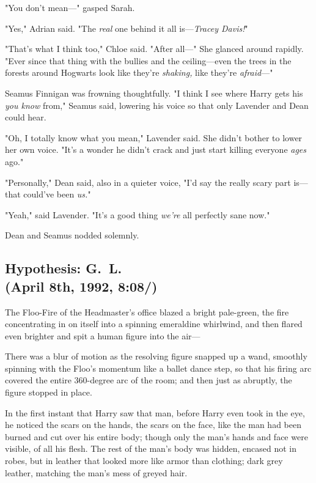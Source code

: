 "You don't mean---" gasped Sarah.

"Yes," Adrian said. "The \emph{real} one behind it all is---\emph{Tracey
Davis!}"

"That's what I think too," Chloe said. "After all---" She glanced around
rapidly. "Ever since that thing with the bullies and the ceiling---even the
trees in the forests around Hogwarts look like they're \emph{shaking,} like
they're \emph{afraid}---"

Seamus Finnigan was frowning thoughtfully. "I think I see where Harry gets
his{\el} \emph{you know{\el}} from," Seamus said, lowering his voice so
that only Lavender and Dean could hear.

"Oh, I totally know what you mean," Lavender said. She didn't bother to lower
her own voice. "It's a wonder he didn't crack and just start killing everyone
\emph{ages} ago."

"Personally," Dean said, also in a quieter voice, "I'd say the really scary
part is---that could've been \emph{us.}"

"Yeah," said Lavender. "It's a good thing \emph{we're} all perfectly sane now."

Dean and Seamus nodded solemnly.
\sbreak
\vspace{-2\baselineskip}
\subsection{Hypothesis: G.~L.\\
(April 8th, 1992, 8:08\PM/)}

The Floo-Fire of the Headmaster's office blazed a bright pale-green, the fire
concentrating in on itself into a spinning emeraldine whirlwind, and then
flared even brighter and spit a human figure into the air---

There was a blur of motion as the resolving figure snapped up a wand, smoothly
spinning with the Floo's momentum like a ballet dance step, so that his firing
arc covered the entire 360-degree arc of the room; and then just as abruptly,
the figure stopped in place.

In the first instant that Harry saw that man, before Harry even took in the
eye, he noticed the scars on the hands, the scars on the face, like the man had
been burned and cut over his entire body; though only the man's hands and face
were visible, of all his flesh. The rest of the man's body was hidden, encased
not in robes, but in leather that looked more like armor than clothing; dark
grey leather, matching the man's mess of greyed hair.

